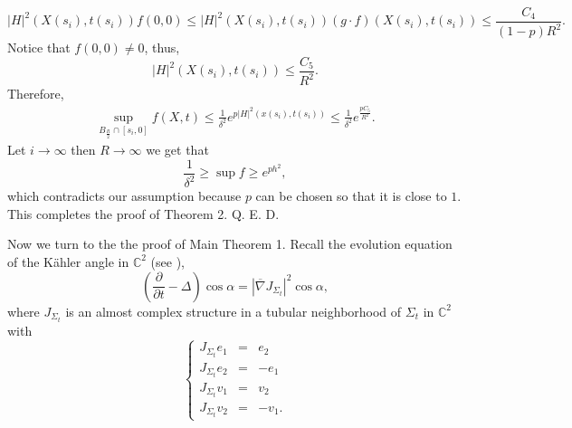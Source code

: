 $$ |H|^2(X(s_i), t(s_i)) f(0, 0)\leq |H|^2(X(s_i), t(s_i))(g\cdot f)(X(s_i), t(s_i))\leq
\frac{C_4}{(1-p)R^2}.
$$ Notice that $f(0, 0)\neq 0$, thus,
$$ |H|^2(X(s_i), t(s_i))\leq
\frac{C_5}{R^2}.
$$  Therefore,
\begin{eqnarray*}
\sup_{B_{\frac{R}{2}}\cap [s_i, 0]} f(X, t)\leq
\frac{1}{\delta^2}e^{p |H|^2(x(s_i), t(s_i))}\leq
\frac{1}{\delta^2} e^{\frac{pC_5}{R^2}}.
\end{eqnarray*} Let $i\to\infty$ then $R\to\infty$ we get that
$$\frac{1}{\delta^2}\geq \sup f\geq e^{ph^2},$$ which contradicts our
assumption because $p$ can be chosen so that it is close to $1$.
This completes the proof of Theorem 2. \hfill Q. E. D.

Now we turn to the the proof of Main Theorem 1. Recall the
evolution equation of the K\"ahler angle in ${\mathbb{C}}^2$ (see
\cite{CL1}), \begin{equation}\label{e3.0}
(\frac{\partial}{\partial t}-\Delta)\cos\alpha=|\overline\nabla
J_{\Sigma_t}|^2\cos\alpha, \end{equation} where $J_{\Sigma_t}$ is
an almost complex structure in a tubular neighborhood of
$\Sigma_t$ in ${\mathbb{C}}^2$ with
\begin{equation}\label{eq2}
\left\{\begin{array}{clcr} J_{\Sigma_t}e_1&=&e_2\\
J_{\Sigma_t}e_2&=&-e_1\\ J_{\Sigma_t}v_1&=&v_2\\
J_{\Sigma_t}v_2&=&-v_1.
\end{array}\right.
\end{equation}

